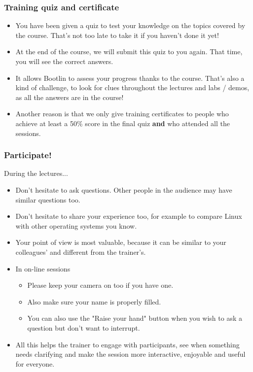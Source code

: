 \begin{frame}
\frametitle{Training quiz and certificate}
\begin{itemize}
\item You have been given a quiz to test your knowledge
      on the topics covered by the course.
      That's not too late to take it if you haven't done it yet!
\item At the end of the course, we will submit this quiz
      to you again. That time, you will see the correct answers.
\item It allows Bootlin to assess your progress thanks to the course.
      That's also a kind of challenge, to look for clues throughout
      the lectures and labs / demos, as all the answers are in the course!
\item Another reason is that we only give training certificates
      to people who achieve at least a 50\% score in the final quiz
      {\bf and} who attended all the sessions.
\end{itemize}
\end{frame}

\begin{frame}

\frametitle{Participate!}
During the lectures...
\begin{itemize}
\item Don't hesitate to ask questions. Other people in the audience may have
similar questions too.
\item Don't hesitate to share your experience too, for example to compare Linux
with other operating systems you know.
\item Your point of view is most valuable, because it can be similar to your
colleagues' and different from the trainer's.
\item In on-line sessions
   \begin{itemize}
   \item Please keep your camera on too if you have one.
   \item Also make sure your name is properly filled.
   \item You can also use the "Raise your hand" button when you wish to ask
         a question but don't want to interrupt.
   \end{itemize}
\item All this helps the trainer to engage with participants, see when
something needs clarifying and make the session more interactive, enjoyable
and useful for everyone.
\end{itemize}
\end{frame}

